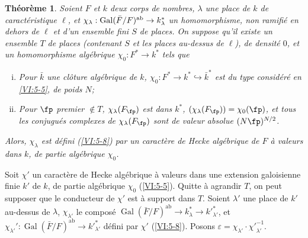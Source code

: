 \documentclass[oneside]{book}
\DeclareMathOperator{\gal}{Gal}
\theoremstyle{sga-source}
\theoremstyle{sga-source-dash}
\theoremstyle{sga-source-dotdash}
\theoremstyle{sga-source-number-note-dash}
\theoremstyle{sga-source-note-number-dotdash}
\theoremstyle{sga-source-example-dotdash}
\theoremstyle{sga-source-inline-number}
\theoremstyle{sga-source-bare-number}
\theoremstyle{sga-source}
\newtheorem{theorem_}[subsection]{Théorème}
\newcommand{\PrintPage}[1]{}\newcommand{\MathPage}[1]{}\newcommand{\PrintCite}[2]{#1}\newcommand{\var}[3]{#2}
\begin{document}
\begin{theorem_}\label{VI:5-10}
\var{Soient $F$ de $k$}{Soient $F$ et $k$}{S45-SOL-0883} deux corps de nombres, $\lambda$ une place de $k$ de 
caractéristique $\ell$, et 
$\chi_\lambda:\gal(\bar F/F)^\textnormal{ab}\to k_\lambda^\ast$ un 
homomorphisme, non ramifié en dehors de $\ell$ et d'un ensemble fini $S$ de 
places. On suppose qu'il existe un ensemble $T$ de places (contenant $S$ et les 
places au-dessus de $\ell$), de densité $0$, et un homomorphisme algébrique 
$\chi_0:F^\ast \to k^\ast$ tels que 
\begin{enumerate}[(i)]
  \item Pour $\bar k$ une clôture algébrique de $k$, 
    $\chi_0:F^\ast \to k^\ast \hookrightarrow \bar k^\ast$ est du type 
    considéré en \ref{VI:5-5}, de poids $N$; 
  \PrintPage{212}
\item Pour $\fp$ premier $\notin T$, $\chi_\lambda(F_\fp)$ est dans 
    $k^\ast$, $(\chi_\lambda(F_\fp))=\chi_0(\fp)$, et tous les conjugués 
    complexes de $\chi_\lambda(F_\fp)$ sont de valeur absolue $(N \fp)^{N/2}$. 
\end{enumerate}

Alors, $\chi_\lambda$ est défini (\ref{VI:5-8}) par un caractère de Hecke 
algébrique de $F$ à valeurs dans $k$, de partie algébrique $\chi_0$. 
\end{theorem_}

Soit $\chi'$ un caractère de Hecke algébrique à valeurs dans une 
extension galoisienne finie $k'$ de $k$, de partie algébrique $\chi_0$ 
(\ref{VI:5-5}). Quitte à agrandir $T$, on peut supposer que le conducteur de 
$\chi'$ est à support dans $T$. Soient $\lambda'$ une place de $k'$ au-dessus 
de $\lambda$, $\chi_{\lambda'}$ le composé 
$\gal(\bar F/F)^\text{ab}\to k_\lambda^\ast \to {k'}_{\lambda'}^\ast$, et 
$\chi_{\lambda'}':\gal(\bar F/F)^\text{ab}\to {k'}_{\lambda'}^\ast$ défini 
par $\chi'$ (\ref{VI:5-8}). Posons 
$\varepsilon = \chi_{\lambda'} \cdot {\chi'}_{\lambda'}^{-1}$. 
\end{document}
